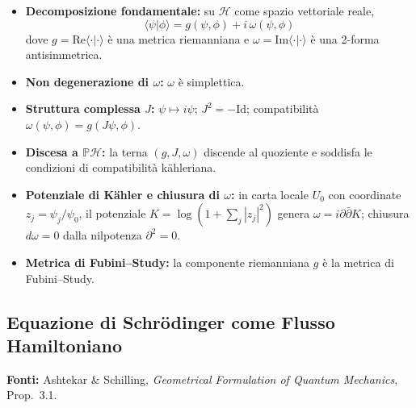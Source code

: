 \documentclass[12pt, a4paper]{article}
\newcommand{\fonti}[1]{%
	\begin{fontebox}
		\textcolor{fontecolor}{\footnotesize\textbf{Fonti:} #1}
	\end{fontebox}%
}
\begin{document}
	\begin{itemize}
		\item \textbf{Decomposizione fondamentale:} su $\mathcal{H}$ come spazio
		vettoriale reale,
		\[
		\langle\psi|\phi\rangle = g(\psi,\phi) + i\,\omega(\psi,\phi)
		\]
		dove $g=\mathrm{Re}\langle\cdot|\cdot\rangle$ è una metrica riemanniana e
		$\omega=\mathrm{Im}\langle\cdot|\cdot\rangle$ è una 2-forma antisimmetrica.
		\item \textbf{Non degenerazione di $\omega$:} $\omega$ è simplettica.
		\item \textbf{Struttura complessa $J$:} $\psi\mapsto i\psi$; $J^2=-\mathrm{Id}$;
		compatibilità $\omega(\psi,\phi)=g(J\psi,\phi)$.
		\item \textbf{Discesa a $\mathbb{P}\mathcal{H}$:} la terna $(g,J,\omega)$ discende
		al quoziente e soddisfa le condizioni di compatibilità kähleriana.
		\item \textbf{Potenziale di Kähler e chiusura di $\omega$:} in carta locale
		$U_0$ con coordinate $z_j=\psi_j/\psi_0$, il potenziale $K=\log(1+\sum_j|z_j|^2)$
		genera $\omega=i\partial\bar\partial K$; chiusura $d\omega=0$ dalla nilpotenza
		$\partial^2=0$.
		\item \textbf{Metrica di Fubini--Study:} la componente riemanniana $g$ è la
		metrica di Fubini--Study.
	\end{itemize}
	
	\subsection{Equazione di Schrödinger come Flusso Hamiltoniano}
	
	\fonti{Ashtekar \& Schilling, \textit{Geometrical Formulation of Quantum Mechanics},
		Prop.~3.1.}
	
\end{document}
